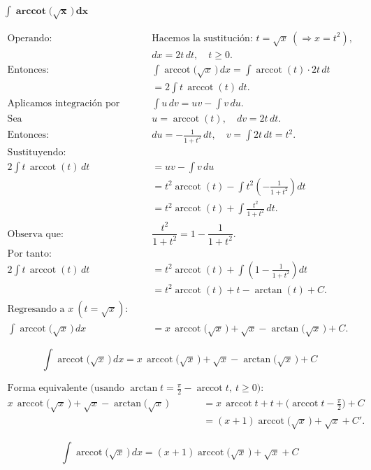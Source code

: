 $
\displaystyle \mathbf{\int \operatorname{arccot}\!\big(\sqrt{x}\,\big)\,dx}
$

\nopagebreak
\begin{align*}
\text{Operando: } 
&\text{Hacemos la sustitución: } t=\sqrt{x}\ (\Rightarrow x=t^{2}), \\[4pt]
&dx=2t\,dt,\quad t\ge0. \\[6pt]
\text{Entonces: } 
&\int \operatorname{arccot}\!\big(\sqrt{x}\,\big)\,dx
= \int \operatorname{arccot}(t)\cdot 2t\,dt \\[4pt]
&= 2\int t\,\operatorname{arccot}(t)\,dt. \\[8pt]
\text{Aplicamos integración por partes: } 
&\int u\,dv = uv - \int v\,du. \\[6pt]
\text{Sea } 
&u=\operatorname{arccot}(t), \quad dv=2t\,dt. \\[6pt]
\text{Entonces: } 
&du = -\frac{1}{1+t^{2}}\,dt, \quad v=\int 2t\,dt = t^{2}. \\[6pt]
\text{Sustituyendo: } \\[4pt]
2\int t\,\operatorname{arccot}(t)\,dt
&= u v - \int v\,du \\[4pt]
&= t^{2}\operatorname{arccot}(t)
- \int t^{2}\!\left(-\frac{1}{1+t^{2}}\right)\!dt \\[4pt]
&= t^{2}\operatorname{arccot}(t)
+ \int \frac{t^{2}}{1+t^{2}}\,dt. \\[6pt]
\text{Observa que: } 
&\dfrac{t^{2}}{1+t^{2}} = 1 - \dfrac{1}{1+t^{2}}. \\[6pt]
\text{Por tanto: } \\[4pt]
2\int t\,\operatorname{arccot}(t)\,dt
&= t^{2}\operatorname{arccot}(t)
+ \int\!\left(1 - \frac{1}{1+t^{2}}\right)\!dt \\[4pt]
&= t^{2}\operatorname{arccot}(t)
+ t - \arctan(t) + C. \\[8pt]
\text{Regresando a } x\ (t=\sqrt{x}): \\[6pt]
\int \operatorname{arccot}\!\big(\sqrt{x}\,\big)\,dx
&= x\,\operatorname{arccot}\!\big(\sqrt{x}\,\big)
+ \sqrt{x} - \arctan\!\big(\sqrt{x}\,\big) + C.
\end{align*}

$$
\boxed{\displaystyle 
\int \operatorname{arccot}\!\big(\sqrt{x}\,\big)\,dx
= x\,\operatorname{arccot}\!\big(\sqrt{x}\,\big)
+ \sqrt{x} - \arctan\!\big(\sqrt{x}\,\big) + C}
$$

\nopagebreak
\begin{align*}
\text{Forma equivalente (usando } 
\arctan t=\tfrac{\pi}{2}-\operatorname{arccot} t,\ t\ge0\text{):} \\[6pt]
x\,\operatorname{arccot}\!\big(\sqrt{x}\,\big)
+ \sqrt{x} - \arctan\!\big(\sqrt{x}\,\big)
&= x\,\operatorname{arccot}t + t + \big(\operatorname{arccot}t - \tfrac{\pi}{2}\big) + C \\[4pt]
&= (x+1)\operatorname{arccot}\!\big(\sqrt{x}\,\big) + \sqrt{x} + C'.
\end{align*}

$$
\boxed{\displaystyle 
\int \operatorname{arccot}\!\big(\sqrt{x}\,\big)\,dx
= (x+1)\operatorname{arccot}\!\big(\sqrt{x}\,\big)
+ \sqrt{x} + C}
$$
